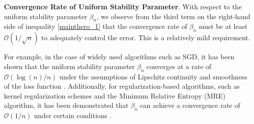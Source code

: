 \begin{remark}\textbf{Convergence Rate of Uniform Stability Parameter}. With respect to the uniform stability parameter $\beta_n$, we observe from the third term on the right-hand side of inequality \ref{mainthero_1} that the convergence rate of $\beta_n$ must be at least $\mathcal{O}(1 / \sqrt{n})$ to adequately control the error. This is a relatively mild requirement.

For example, in the case of widely used algorithms such as SGD, it has been shown that the uniform stability parameter $\beta_n$ converges at a rate of $\mathcal{O}(\log (n) / n)$ under the assumptions of Lipschitz continuity and smoothness of the loss function \citep{zhang2022stability}. Additionally, for regularization-based algorithms, such as kernel regularization schemes and the Minimum Relative Entropy (MRE) algorithm, it has been demonstrated that $\beta_n$ can achieve a convergence rate of $\mathcal{O}(1 / n)$ under certain conditions \citep{bousquet2002stability}.

\end{remark}

